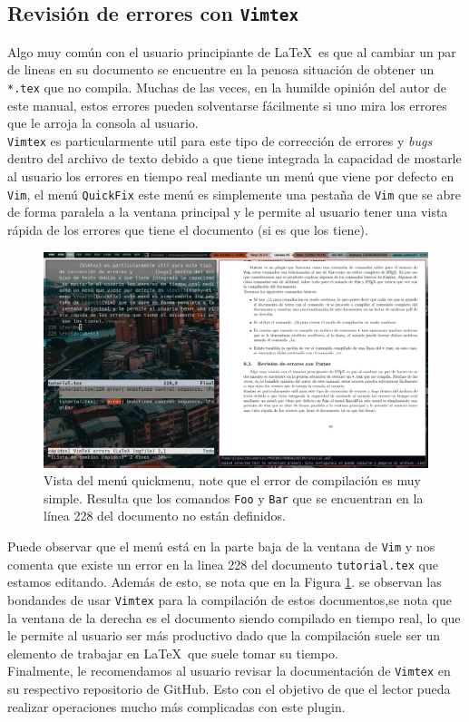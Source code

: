 \documentclass[10pt]{article}
\begin{document}
\subsection{Revisión de errores con \texttt{Vimtex}}
Algo muy común con el usuario principiante de \LaTeX \ es que al cambiar un par de lineas en su documento se encuentre en la penosa situación de obtener un \texttt{*.tex} que no compila. Muchas de las veces, en la humilde opinión del autor de este manual, estos errores pueden solventarse fácilmente si uno mira los errores que le arroja la consola al usuario.\\
\texttt{Vimtex} es particularmente util para este tipo de corrección de errores y \textit{bugs} dentro del archivo de texto debido a que tiene integrada la capacidad de mostarle al usuario los errores en tiempo real mediante un menú que viene por defecto en \texttt{Vim}, el menú \texttt{QuickFix} este menú es simplemente una pestaña de \texttt{Vim} que se abre de forma paralela a la ventana principal y le permite al usuario tener una vista rápida de los errores que tiene el documento (si es que los tiene).\newpage
\begin{figure}[t]
\begin{center}
	\includegraphics[scale=0.4]{./img/Quickfixmenu.png}
\end{center}
\caption{Vista del menú quickmenu, note que el error de compilación es muy simple. Resulta que los comandos \texttt{Foo} y \texttt{Bar} que se encuentran en la línea 228 del documento no están definidos.}
\label{fig4}
\end{figure}
Puede observar que el menú está en la parte baja de la ventana de \texttt{Vim} y nos comenta que existe un error en la linea 228 del documento \texttt{tutorial.tex} que estamos editando. Además de esto, se nota que en la Figura \ref{fig4}. se observan las bondandes de usar \texttt{Vimtex} para la compilación de estos documentos,se nota que la ventana de la derecha es el documento siendo compilado en tiempo real, lo que le permite al usuario ser más productivo dado que la compilación suele ser un elemento de trabajar en \LaTeX \ que suele tomar su tiempo.\\
Finalmente, le recomendamos al usuario revisar la documentación de \texttt{Vimtex} en su respectivo repositorio de GitHub. Esto con el objetivo de que el lector pueda realizar operaciones mucho más complicadas con este plugin. 
\end{document}
